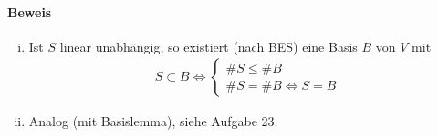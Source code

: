 \paragraph{Beweis}
    \begin{enumerate}[(i)]
        \item Ist $ S $ linear unabhängig, so existiert (nach BES) eine Basis $ B $ von $ V $ mit 
            \begin{gather*}
                S\subset B\Leftrightarrow \left\{
                \begin{array}{l}
                    \#S \leq \#B\\
                    \#S = \#B \Leftrightarrow S = B
                \end{array}\right.
            \end{gather*}
        \item Analog (mit Basislemma), siehe Aufgabe 23.
        \end{enumerate} 
